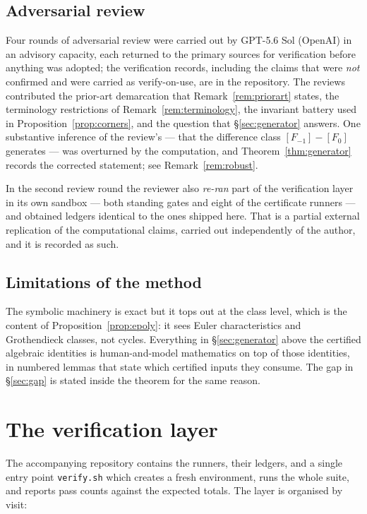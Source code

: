 \documentclass[11pt]{article}
\theoremstyle{definition}
\theoremstyle{remark}
\begin{document}
\subsection{Adversarial review}

Four rounds of adversarial review were carried out by GPT-5.6 Sol (OpenAI) in
an advisory capacity, each returned to the primary sources for verification
before anything was adopted; the verification records, including the
claims that were \emph{not} confirmed and were carried as verify-on-use, are
in the repository. The reviews contributed the prior-art demarcation that
Remark~\ref{rem:priorart} states, the terminology restrictions of
Remark~\ref{rem:terminology}, the invariant battery used in
Proposition~\ref{prop:corners}, and the question that
\S\ref{sec:generator} answers. One substantive inference of the review's ---
that the difference class $[F_{-1}]-[F_0]$ generates --- was overturned by the
computation, and Theorem~\ref{thm:generator} records the corrected statement;
see Remark~\ref{rem:robust}.

In the second review round the reviewer also \emph{re-ran} part of the
verification layer in its own sandbox --- both standing gates and eight of the
certificate runners --- and obtained ledgers identical to the ones shipped
here. That is a partial external replication of the computational claims,
carried out independently of the author, and it is recorded as such.

\subsection{Limitations of the method}

The symbolic machinery is exact but it tops out at the class level, which is
the content of Proposition~\ref{prop:epoly}: it sees Euler characteristics and
Grothendieck classes, not cycles. Everything in \S\ref{sec:generator} above
the certified algebraic identities is human-and-model mathematics on top of
those identities, in numbered lemmas that state which certified inputs they
consume. The gap in \S\ref{sec:gap} is stated inside the theorem for the same
reason.

\section{The verification layer}\label{app:verify}

The accompanying repository contains the runners, their ledgers, and a single
entry point \texttt{verify.sh} which creates a fresh environment, runs the
whole suite, and reports pass counts against the expected totals. The layer
is organised by visit:
\end{document}
